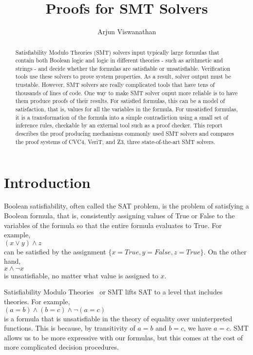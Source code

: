 \documentclass{article}
\begin{document}
\title{Proofs for SMT Solvers}
\author{Arjun Viswanathan}
\date{}
\maketitle

\begin{abstract}
Satisfiability Modulo Theories (SMT) solvers input typically
large formulas that contain both Boolean logic and logic in 
different theories - such as arithmetic and strings - and 
decide whether 
the formulas are satisfiable or unsatisfiable. Verification 
tools use these solvers to prove system properties. As a 
result, solver output must be trustable. However, SMT solvers 
are really complicated tools that have tens of thousands of lines of code. One way to make SMT solver ouput more reliable is 
to have them produce proofs of their results. 
For satisfied formulas, this can be a model of 
satisfaction, that is, values for all the variables in the
formula. For unsatisfied formulas, it is a transformation of 
the formula into a simple contradiction using a small set of 
inference rules, checkable by an external tool such as a proof 
checker. This report describes the proof producing mechanisms 
commonly used SMT solvers and compares the proof systems 
of CVC4, VeriT, and Z3, three state-of-the-art SMT solvers.
\end{abstract}

\section{Introduction}
\label{sec:intro}
Boolean satisfiability, often called the SAT problem, 
is the problem of satisfying a Boolean formula, that is, 
consistently assigning values of True or False to the variables 
of the formula so that the entire formula evaluates to True. 
For example, \\ 
$(x \lor y) \land z$ \\
can be satisfied by the 
assignment $\{x=True,y=False,z=True\}$. On the other hand, \\
$x \land \neg x$ \\
is unsatisfiable, no matter what value is assigned to $x$.

Satisfiability Modulo Theories~\cite{DBLP:reference/mc/BarrettT18} or SMT 
lifts SAT to a level that includes theories. 
For example, \\
$(a = b) \land (b = c) \land \neg (a = c)$ \\
is a formula that is unsatisfiable in the theory of 
equality over uninterpreted functions. This is because, by
transitivity of $a = b$ and $b = c$, we have $a = c$. SMT 
allows us to be more expressive with our formulas, but 
this comes at the cost of more complicated decision 
procedures.
\end{document}
